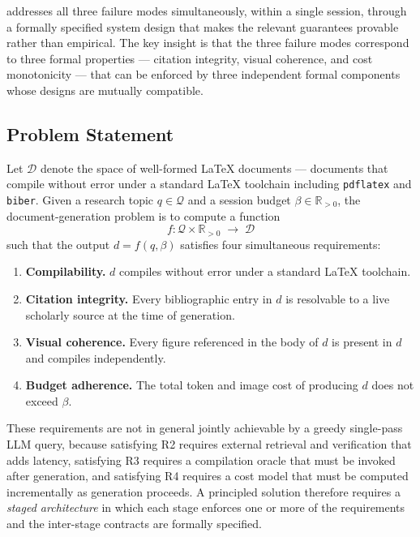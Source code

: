 \sys{} addresses all three failure modes simultaneously, within a single session, through
a formally specified system design that makes the relevant guarantees provable rather than
empirical.
The key insight is that the three failure modes correspond to three formal properties —
citation integrity, visual coherence, and cost monotonicity — that can be enforced by
three independent formal components whose designs are mutually compatible.

\subsection{Problem Statement}

Let $\mathcal{D}$ denote the space of well-formed \LaTeX{} documents — documents that
compile without error under a standard \LaTeX{} toolchain including \texttt{pdflatex}
and \texttt{biber}.
Given a research topic $q\in\mathcal{Q}$ and a session budget $\beta\in\mathbb{R}_{>0}$,
the document-generation problem is to compute a function
\[
  f:\mathcal{Q}\times\mathbb{R}_{>0}\;\longrightarrow\;\mathcal{D}
\]
such that the output $d=f(q,\beta)$ satisfies four simultaneous requirements:

\begin{enumerate}[label=\textbf{R\arabic*.},leftmargin=2.4em]
  \item \textbf{Compilability.} $d$ compiles without error under a standard \LaTeX{} toolchain.
  \item \textbf{Citation integrity.} Every bibliographic entry in $d$ is resolvable to a live
        scholarly source at the time of generation.
  \item \textbf{Visual coherence.} Every figure referenced in the body of $d$ is present in $d$
        and compiles independently.
  \item \textbf{Budget adherence.} The total token and image cost of producing $d$ does not
        exceed $\beta$.
\end{enumerate}

These requirements are not in general jointly achievable by a greedy single-pass LLM
query, because satisfying R2 requires external retrieval and verification that adds latency,
satisfying R3 requires a compilation oracle that must be invoked after generation, and
satisfying R4 requires a cost model that must be computed incrementally as generation proceeds.
A principled solution therefore requires a \emph{staged architecture} in which each stage
enforces one or more of the requirements and the inter-stage contracts are formally specified.

